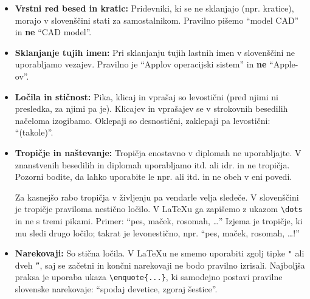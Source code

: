 \documentclass[a4paper,12pt,openright]{book}
\begin{document}
\begin{itemize}
    \item \textbf{Vrstni red besed in kratic:} Pridevniki, ki se ne sklanjajo (npr. kratice), morajo v slovenščini stati za samostalnikom. Pravilno pišemo \enquote{model CAD} in \textbf{ne} \enquote{CAD model}.
    
    \item \textbf{Sklanjanje tujih imen:} Pri sklanjanju tujih lastnih imen v slovenščini ne uporabljamo vezajev. Pravilno je \enquote{Applov operacijski sistem} in \textbf{ne} \enquote{Apple-ov}.
    
    \item \textbf{Ločila in stičnost:} Pika, klicaj in vprašaj so levostični (pred njimi ni presledka, za njimi pa je). Klicajev in vprašajev se v strokovnih besedilih načeloma izogibamo. Oklepaji so desnostični, zaklepaji pa levostični: \enquote{(takole)}.
    
    \item \textbf{Tropičje in naštevanje:} Tropičja enostavno v diplomah ne uporabljajte. V znanstvenih besedilih in diplomah uporabljamo itd. ali idr. in ne tropičja. Pozorni bodite, da lahko uporabite le npr. ali itd. in ne obeh v eni povedi.
    
    Za kasnejšo rabo tropičja v življenju pa vendarle velja sledeče. V slovenščini je tropičje praviloma nestično ločilo. V \LaTeX u ga zapišemo z ukazom \texttt{\textbackslash dots} in ne s tremi pikami. Primer: \enquote{pes, maček, rosomah, \dots} Izjema je tropičje, ki mu sledi drugo ločilo; takrat je levonestično, npr. \enquote{pes, maček, rosomah, \dots!}
    
    \item \textbf{Narekovaji:} So stična ločila. V \LaTeX u ne smemo uporabiti zgolj tipke \texttt{"} ali dveh \texttt{''}, saj se začetni in končni narekovaji ne bodo pravilno izrisali. Najboljša praksa je uporaba ukaza \texttt{\textbackslash enquote\{...\}}, ki samodejno postavi pravilne slovenske narekovaje: \enquote{spodaj devetice, zgoraj šestice}.
    

\end{itemize}
\end{document}
